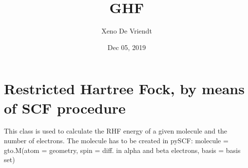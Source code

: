 \documentclass[letterpaper,10pt,english]{sphinxmanual}
\title{GHF}
\date{Dec 05, 2019}
\author{Xeno De Vriendt}
\begin{document}
\pagestyle{empty}
\sphinxmaketitle
\pagestyle{plain}
\sphinxtableofcontents
\pagestyle{normal}
\label{\detokenize{index::doc}}

\label{\detokenize{RHF:module-ghf.RHF}}

\chapter{Restricted Hartree Fock, by means of SCF procedure}
\label{\detokenize{RHF:restricted-hartree-fock-by-means-of-scf-procedure}}\label{\detokenize{RHF::doc}}
This class is used to calculate the RHF energy of a given molecule and the number of electrons.
The molecule has to be created in pySCF:
molecule = gto.M(atom = geometry, spin = diff. in alpha and beta electrons, basis = basis set)
\end{document}
